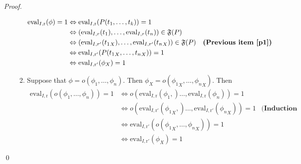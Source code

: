 \documentclass[a4paper]{llncs}
\begin{document}
\begin{proof}
\begin{enumerate}
\begin{enumerate}
\begin{align*}
        \mathrm{eval}_{I,\mathrm{r}}(\phi)=1 & \Leftrightarrow \mathrm{eval}_{I,\mathrm{r}}(P(t_1,\ldots,t_k))=1\\
        & \Leftrightarrow (\mathrm{eval}_{I,r}(t_1),\ldots,\mathrm{eval}_{I,r}(t_n))\in \mathfrak{F}(P)\\
        &\Leftrightarrow (\mathrm{eval}_{I,r'}({t_1}_X),\ldots,\mathrm{eval}_{I,r'}({t_n}_X))\in \mathfrak{F}(P)&\textbf{(Previous item~\ref{p1})}\\
        & \Leftrightarrow \mathrm{eval}_{I,\mathrm{r}'}(P({t_1}_X,\ldots,{t_n}_X))=1\\
        & \Leftrightarrow \mathrm{eval}_{I,\mathrm{r}'}(\phi_X)=1
         \end{align*}
      \item Suppose that $\phi=o(\phi_1,\ldots,\phi_n)$.
        Then $\phi_X=o({\phi_1}_X,\ldots,{\phi_n}_X)$.
        Then   
        \begin{align*}
          \mathrm{eval}_{I,\mathrm{r}}(o(\phi_1,\ldots,\phi_n))=1 & \Leftrightarrow o(\mathrm{eval}_{I,\mathrm{r}}({\phi_1},)\ldots,\mathrm{eval}_{I,\mathrm{r}}({\phi_n}))=1\\
          & \Leftrightarrow o(\mathrm{eval}_{I,\mathrm{r}'}({\phi_1}_X,)\ldots,\mathrm{eval}_{I,\mathrm{r}'}({\phi_n}_X))=1&\textbf{(Induction hypothesis)}\\
          & \Leftrightarrow \mathrm{eval}_{I,\mathrm{r}'}(o({\phi_1}_X,\ldots,{\phi_n}_X))=1\\
          & \Leftrightarrow \mathrm{eval}_{I,\mathrm{r}'}(\phi_X)=1
         \end{align*}
    \end{enumerate}
    \end{enumerate}    
    \qed
  \end{proof}
  
\end{document}
